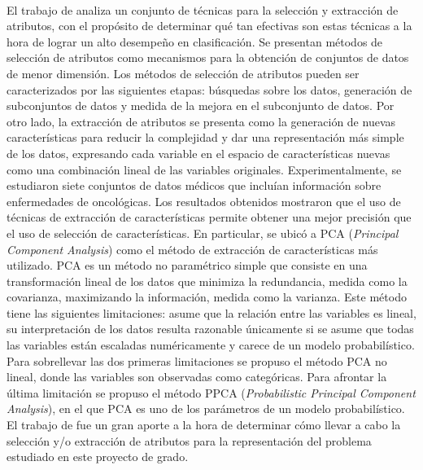 \paragraph{}El trabajo de \citet{survey-feature-selection-extraction} analiza un conjunto de técnicas para la selección y extracción de atributos, con el propósito de determinar qué tan efectivas son estas técnicas a la hora de lograr un alto desempeño en clasificación. Se presentan métodos de selección de atributos como mecanismos para la obtención de conjuntos de datos de menor dimensión. Los métodos de selección de atributos pueden ser caracterizados por las siguientes etapas: búsquedas sobre los datos, generación de subconjuntos de datos y medida de la mejora en el subconjunto de datos. Por otro lado, la extracción de atributos se presenta como la generación de nuevas características para reducir la complejidad y dar una representación más simple de los datos, expresando cada variable en el espacio de características nuevas como una combinación lineal de las variables originales. Experimentalmente, se estudiaron siete conjuntos de datos médicos que incluían información sobre enfermedades de oncológicas. Los resultados obtenidos mostraron que el uso de técnicas de extracción de características permite obtener una mejor precisión que el uso de selección de características. En particular, se ubicó a PCA (\textit{Principal Component Analysis}) como el método de extracción de características más utilizado. PCA es un método no paramétrico simple que consiste en una transformación lineal de los datos que minimiza la redundancia, medida como la covarianza, maximizando la información, medida como la varianza. Este método tiene las siguientes limitaciones: asume que la relación entre las variables es lineal, su interpretación de los datos resulta razonable únicamente si se asume que todas las variables están escaladas numéricamente y carece de un modelo probabilístico. Para sobrellevar las dos primeras limitaciones se propuso el método PCA no lineal, donde las variables son observadas como categóricas. Para afrontar la última limitación se propuso el método PPCA (\textit{Probabilistic Principal Component Analysis}), en el que PCA es uno de los parámetros de un modelo probabilístico. 
El trabajo de \citet{survey-feature-selection-extraction} fue un gran aporte a la hora de determinar cómo llevar a cabo la selección y/o extracción de atributos para la representación del problema estudiado en este proyecto de grado.



